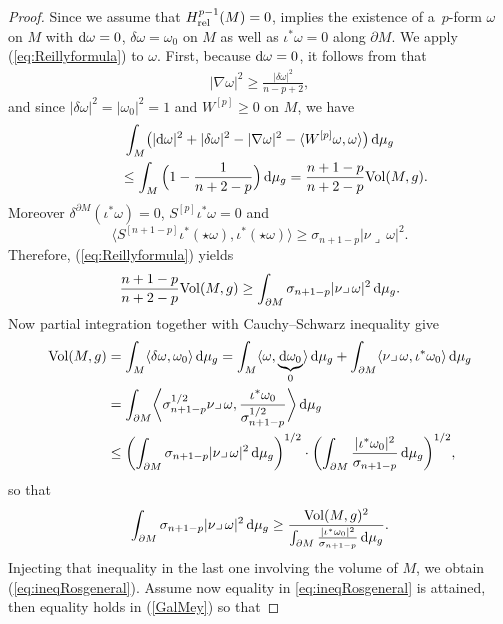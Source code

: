 \documentclass[pdftex]{sigma}
\numberwithin{equation}{section}
\begin{document}
\begin{proof} Since we assume that $H_{\rm rel}^{p-1}(M)=0$, \cite[Theorem~3.2.5]{Schwarz95} implies the existence of a~$p$-form $\omega$ on $M$ with ${\rm d}\omega=0$, $\delta\omega=\omega_0$ on $M$ as well as $\iota^*\omega=0$ along $\partial M$. We apply (\ref{eq:Reillyformula}) to $\omega$.
 First, because ${\rm d}\omega=0$, it follows from \cite[Lemme 6.8]{GallotMeyer75} that
\begin{gather}\label{GalMey}
|\nabla\omega|^2\geq\frac{|\delta\omega|^2}{n-p+2},
\end{gather}
and since $|\delta\omega|^2=|\omega_0|^2=1$ and $W^{[p]}\geq0$ on $M$, we have
\begin{gather*}
\int_M\bigl(|{\rm d}\omega|^2+|\delta\omega|^2-|\nabla\omega|^2-\langle W^{[p]}\omega,\omega\rangle\bigr)\,{\rm d}\mu_g\\
\qquad{} \leq \int_M\Big(1-\frac{1}{n+2-p}\Big)\,{\rm d}\mu_g = \frac{n+1-p}{n+2-p}\mathrm{Vol}(M,g).
\end{gather*}
Moreover $\delta^{\partial M}(\iota^*\omega)=0$, $S^{[p]}\iota^*\omega=0$ and
\[\bigl\langle S^{[n+1-p]}\iota^*(\star\omega),\iota^*(\star\omega)\bigr\rangle\geq\sigma_{n+1-p}|\nu\lrcorner\,\omega|^2.\]
Therefore, (\ref{eq:Reillyformula}) yields
\[\frac{n+1-p}{n+2-p}\mathrm{Vol}(M,g)\geq\int_{\partial M}\sigma_{n+1-p}|\nu\lrcorner\,\omega|^2\,{\rm d}\mu_g.\]
Now partial integration together with Cauchy--Schwarz i\-ne\-qua\-li\-ty give
\begin{align}
\mathrm{Vol}(M,g)&= \int_M\langle\delta\omega,\omega_0\rangle\,{\rm d}\mu_g
=\int_M\langle\omega,\underbrace{{\rm d}\omega_0}_{0}\rangle\,{\rm d}\mu_g+\int_{\partial M}\langle\nu\lrcorner\,\omega,\iota^*\omega_0\rangle\,{\rm d}\mu_g\nonumber\\
&= \int_{\partial M}\biggl\langle\sigma_{n+1-p}^{1/2}\nu\lrcorner\,\omega,\frac{\iota^*\omega_0}{\sigma_{n+1-p}^{1/2}}\biggr\rangle\,{\rm d}\mu_g\nonumber\\
&\leq \biggl(\int_{\partial M}\sigma_{n+1-p}|\nu\lrcorner\,\omega|^2\,{\rm d}\mu_g\biggr)^{1/2}\cdot
\biggl(\int_{\partial M}\frac{|\iota^*\omega_0|^2}{\sigma_{n+1-p}}\,{\rm d}\mu_g\biggr)^{1/2},\label{eq:cauchyschwarz}
\end{align}
so that
\[\int_{\partial M}\sigma_{n+1-p}|\nu\lrcorner\,\omega|^2\,{\rm d}\mu_g\geq\frac{\mathrm{Vol}(M,g)^2}{\int_{\partial M}\frac{|\iota^*\omega_0|^2}{\sigma_{n+1-p}}\,{\rm d}\mu_g}.\]
Injecting that i\-ne\-qua\-li\-ty in the last one involving the volume of $M$, we obtain (\ref{eq:ineqRosgeneral}). Assume now equality in \eqref{eq:ineqRosgeneral} is attained, then equality holds in (\ref{GalMey}) so that

\end{proof}
\end{document}
